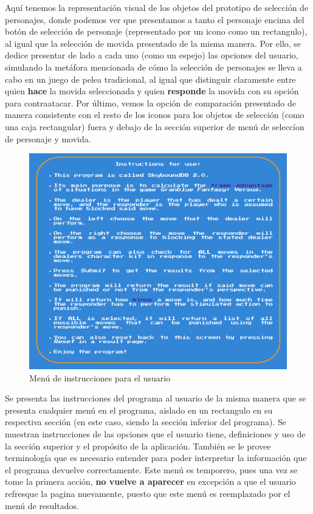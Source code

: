     Aquí tenemos la representación visual de los objetos del prototipo de selección de personajes, donde podemos ver que presentamos a tanto el personaje encima del botón de selección de personaje (representado por un icono como un rectangulo), al igual que la selección de movida presentado de la misma manera. Por ello, se dedice presentar de lado a cada uno (como un espejo) las opciones del usuario, simulando la metáfora mencionada de cómo la selección de personajes se lleva a cabo en un juego de pelea tradicional, al igual que distinguir claramente entre quien \textbf{hace} la movida seleccionada y quien \textbf{responde} la movida con su  opción para contraatacar. Por último, vemos la opción de comparación presentado de manera consistente con el resto de los iconos para los objetos de selección (como una caja rectangular) fuera y debajo de la sección superior de menú de seleccíon de personaje y movida.

\begin{center}
    \begin{figure}
        \centering
        \includegraphics[height=0.4\textheight]{figures/Instructions_menu-object.png}
        \caption{Menú de instrucciones para el usuario}
        \label{fig: ins prt}
    \end{figure}
\end{center}

\newpage
    Se presenta las instrucciones del programa al usuario de la misma manera que se presenta cualquier menú en el programa, aislado en un rectangulo en su respectiva sección (en este caso, siendo la sección inferior del programa). Se muestran instrucciones de las opciones que el usuario tiene, definiciones y uso de la sección superior y el propósito de la aplicación. También se le provee terminología que es necesario entender para poder interpretar la información que el programa devuelve correctamente. Este menú es temporero, pues una vez se tome la primera acción, \textbf{no vuelve a aparecer} en excepción a que el usuario refresque la pagina nuevamente, puesto que este menú es reemplazado por el menú de resultados.

